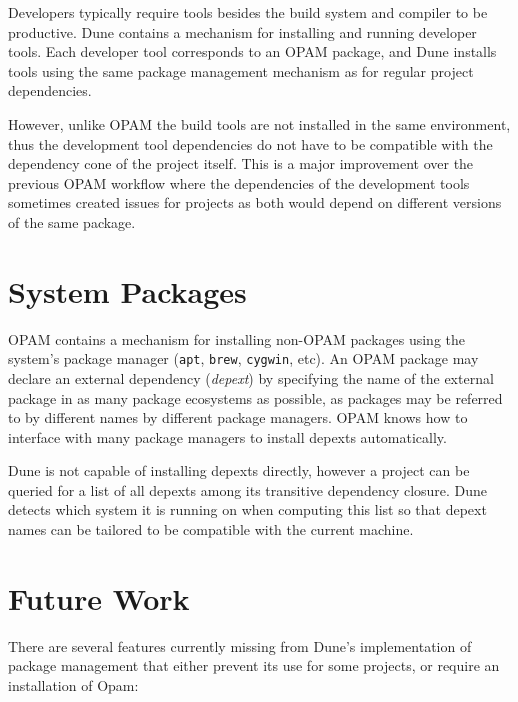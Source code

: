 \documentclass{article}
\begin{document}
\begin{multicols}{2}
        Developers typically require tools besides the build system and compiler
        to be productive. Dune contains a mechanism for installing and running
        developer tools. Each developer tool corresponds to an OPAM package, and
        Dune installs tools using the same package management mechanism as for
        regular project dependencies.

        However, unlike OPAM the build tools are not installed in the same
        environment, thus the development tool dependencies do not have to be
        compatible with the dependency cone of the project itself. This is a
        major improvement over the previous OPAM workflow where the
        dependencies of the development tools sometimes created issues for
        projects as both would depend on different versions of the same
        package.

        \section {System Packages}

        OPAM contains a mechanism for installing non-OPAM packages using the
        system's package manager (\texttt{apt}, \texttt{brew}, \texttt{cygwin},
        etc). An OPAM package may declare an external dependency
        (\textit{depext}) by specifying the name of the external package in as
        many package ecosystems as possible, as packages may be referred to by
        different names by different package managers. OPAM knows how to
        interface with many package managers to install depexts automatically.

        Dune is not capable of installing depexts directly, however a project
        can be queried for a list of all depexts among its transitive dependency
        closure. Dune detects which system it is running on when computing
        this list so that depext names can be tailored to be compatible with
        the current machine.

        \section {Future Work}

        There are several features currently missing from Dune's implementation
        of package management that either prevent its use for some projects, or
        require an installation of Opam:


\end{multicols}
\end{document}
